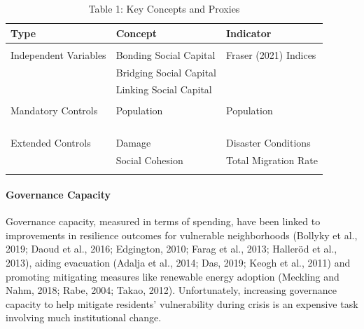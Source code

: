 \documentclass[]{elsarticle} %
\begin{document}
\begin{table}

\caption{\label{tab:table1}Table 1: Key Concepts and Proxies}
\begin{tabular}[t]{lll}
\toprule
Type & Concept & Indicator\\
\midrule
\cellcolor{gray!6}{Outcome} & \cellcolor{gray!6}{Social Vulnerability} & \cellcolor{gray!6}{Fraser (2021) Indices}\\
\midrule
Independent Variables & Bonding Social Capital & Fraser (2021) Indices\\
 & Bridging Social Capital & \\
 & Linking Social Capital & \\
\cellcolor{gray!6}{Temporal Effects} & \cellcolor{gray!6}{Time} & \cellcolor{gray!6}{Annual Fixed Effects}\\
\addlinespace
Mandatory Controls & Population & Population\\
\cellcolor{gray!6}{Basic Controls} & \cellcolor{gray!6}{Governance Capacity} & \cellcolor{gray!6}{Financial Strength Index}\\
\cellcolor{gray!6}{} & \cellcolor{gray!6}{Policy Tools} & \cellcolor{gray!6}{Disaster Relief Spending Rate}\\
\cellcolor{gray!6}{} & \cellcolor{gray!6}{} & \cellcolor{gray!6}{Emergency Services Spending Rate}\\
\cellcolor{gray!6}{} & \cellcolor{gray!6}{} & \cellcolor{gray!6}{Public Works Spending Rate}\\
\addlinespace
Extended Controls & Damage & Disaster Conditions\\
 & Social Cohesion & Total Migration Rate\\
\cellcolor{gray!6}{Regional Controls} & \cellcolor{gray!6}{Geography} & \cellcolor{gray!6}{Regional Fixed Effects}\\
\bottomrule
\end{tabular}
\end{table}

\hypertarget{governance-capacity}{%
\paragraph{Governance Capacity}\label{governance-capacity}}

Governance capacity, measured in terms of spending, have been linked to
improvements in resilience outcomes for vulnerable neighborhoods
(Bollyky et al., 2019; Daoud et al., 2016; Edgington, 2010; Farag et
al., 2013; Halleröd et al., 2013), aiding evacuation (Adalja et al.,
2014; Das, 2019; Keogh et al., 2011) and promoting mitigating measures
like renewable energy adoption (Meckling and Nahm, 2018; Rabe, 2004;
Takao, 2012). Unfortunately, increasing governance capacity to help
mitigate residents' vulnerability during crisis is an expensive task
involving much institutional change.
\end{document}
